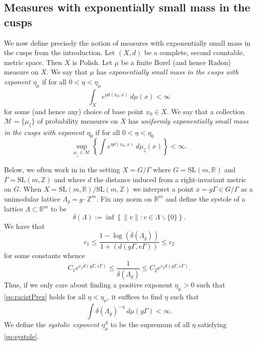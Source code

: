 \documentclass[10pt,reqno]{amsart}
\theoremstyle{Theorem}
\theoremstyle{definition}
\theoremstyle{remark}
\newcommand{\note}[1]{\marginpar{{\color{red}\footnotesize \begin{spacing}{1}#1\end{spacing}}}}
\newcommand{\sm}{\smallsetminus}
\newcommand{\R}{\mathbb {R}}
\newcommand{\Z}{\mathbb {Z}}
\newcommand{\Sl}{\mathrm{SL}}
\def\red{\color{red}}
\begin{document}
\subsection{Measures with exponentially small mass in the cusps}\label{sec:sampson}
We now define precisely  the notion of measures with exponentially small mass in the cusps from the introduction.
Let $(X,d)$ be a complete,  second countable, metric space.  Then $X$ is Polish.  Let  $\mu$ be a finite Borel (and hence Radon) measure on $X$.  We say that $\mu$ has \emph{exponentially small mass in the cusps with exponent $\eta_\mu$} if for all  $0<\eta<\eta_\mu$
\begin{equation}\label{eq:racistPrez}\int_X e^{\eta d(x_0, x)} \ d \mu(x) <\infty\end{equation}
for some (and hence any) choice of base point $x_0\in X$.
We say that a collection $\mathcal M=\{\mu_\zeta \}$ of probability measures on $X$ has \emph{uniformly exponentially small mass in the cusps with exponent $\eta_0$} if for all  $0<\eta<\eta_0$
$$\sup_{\mu_\zeta\in \mathcal M} \left\{\int e^{\eta d(x_0, x)} \ d \mu_\zeta(x)\right\} <\infty.$$

Below, we often work in in the setting $X= G/\Gamma$ where $G = \Sl(m,\R)$ and $\Gamma= \Sl(m,\Z)$ and where $d$ the distance induced from a right-invariant metric on $G$.
When $X=   \Sl(m,\R)/\Sl(m,\Z)$ we interpret  a point $x= g\Gamma \in G/\Gamma$ as a unimodular lattice $\Lambda_g = g\cdot \Z^m$.   Fix any norm on $\R^m$ and define the systole of a lattice  $\Lambda\subset \R^m$ to be $$\delta(\Lambda):= \inf\left\{ \| v\| : v\in \Lambda\sm \{0\}\right\}.$$
We have that  \begin{equation}\label{eq:ploy}c_1\le \frac{1- \log(\delta(\Lambda_g))}{1+ (d(g\Gamma, e\Gamma))} \le c_2\end{equation}
for some constants whence $$C_1 e^{c_1d(g\Gamma, e\Gamma)} \le \frac {1}{\delta(\Lambda_g)} \le C_2 e^{c_2 d(g\Gamma, e\Gamma)}.$$
Thus, if we only care about finding a positive exponent $\eta_\mu>0$  such that \eqref{eq:racistPrez} holds for all $\eta<\eta_\mu$, it suffices to find $\eta$ such that
\begin{equation}\label{eq:systole} \int \delta(\Lambda_g)^{-\eta}  \ d \mu(g\Gamma) <\infty.\end{equation}
We define the \emph{systolic exponent} $\eta^S_\mu$ to be the supremum of all $\eta$ satisfying \eqref{eq:systole}.
\end{document}
